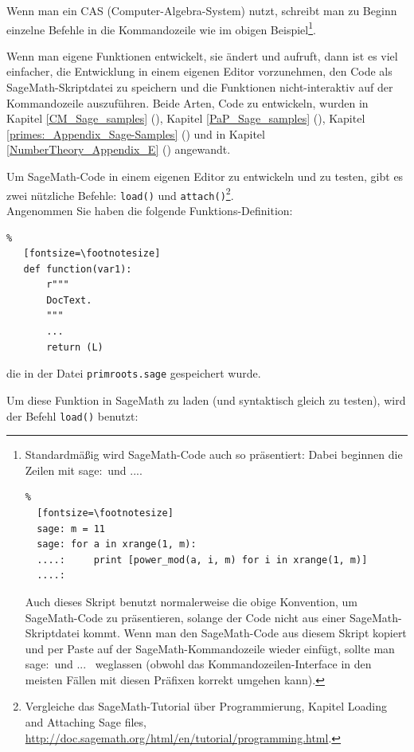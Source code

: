 Wenn man ein CAS (Computer-Algebra-System) nutzt, schreibt man zu Beginn einzelne
Befehle in die Kommandozeile wie im obigen Beispiel\footnote{%
  Standardmäßig wird SageMath-Code auch so präsentiert: Dabei beginnen die Zeilen
  mit  \glqq sage:\grqq~und \glqq ...\grqq.
  \begin{Verbatim}%
  [fontsize=\footnotesize]
  sage: m = 11
  sage: for a in xrange(1, m):
  ....:     print [power_mod(a, i, m) for i in xrange(1, m)]
  ....:
  \end{Verbatim}

  \noindent Auch dieses Skript benutzt normalerweise die obige Konvention, um
  SageMath-Code zu präsentieren, solange der Code nicht aus einer SageMath-Skriptdatei kommt.
  Wenn man den SageMath-Code aus diesem Skript kopiert und per Paste auf der SageMath-Kommandozeile
  wieder einfügt, sollte man \glqq sage:\grqq~und \glqq ...\grqq~ weglassen
  (obwohl das Kommandozeilen-Interface in den meisten Fällen mit diesen Präfixen
  korrekt umgehen kann).}.

Wenn man eigene Funktionen entwickelt, sie ändert und aufruft, dann ist es viel einfacher,
die Entwicklung in einem eigenen Editor vorzunehmen, den Code als SageMath-Skriptdatei zu
speichern und die Funktionen nicht-interaktiv auf der Kommandozeile auszuführen.
Beide Arten, Code zu entwickeln, wurden in
Kapitel \ref{CM_Sage_samples} (\glqq {}\grqq),
Kapitel \ref{PaP_Sage_samples} (\glqq {}\grqq),
Kapitel \ref{primes:_Appendix_Sage-Samples} (\glqq {}\grqq)
und in Kapitel \ref{NumberTheory_Appendix_E} (\glqq{}\grqq)
angewandt.

\noindent Um SageMath-Code in einem eigenen Editor zu entwickeln und zu testen, gibt es zwei
nützliche Befehle: \verb!load()! und \verb!attach()!\footnote{%
Vergleiche das SageMath-Tutorial über Programmierung, Kapitel
\glqq Loading and Attaching Sage files\grqq,\\
\url{http://doc.sagemath.org/html/en/tutorial/programming.html}.}.\\
Angenommen Sie haben die folgende Funktions-Definition:
\begin{Verbatim}%
   [fontsize=\footnotesize]
   def function(var1):
       r"""
       DocText.
       """
       ...
       return (L)
\end{Verbatim}
\noindent die in der Datei \texttt{primroots.sage} gespeichert wurde.

\noindent Um diese Funktion in SageMath zu laden (und syntaktisch gleich zu testen),
wird der Befehl \verb!load()! benutzt:


